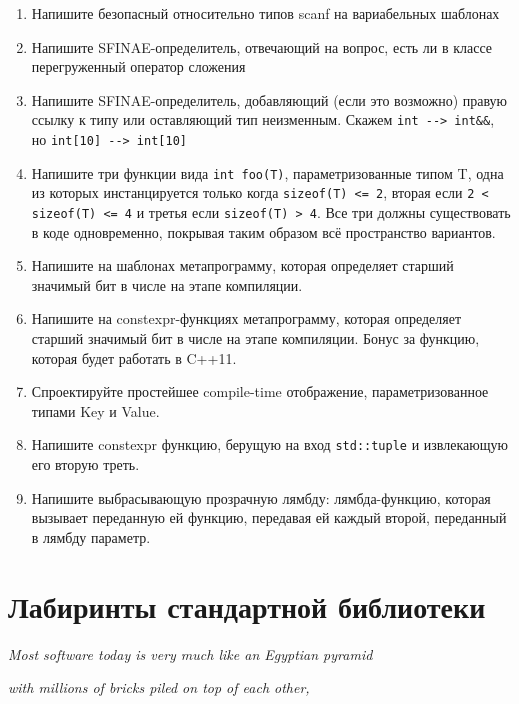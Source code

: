 \documentclass[a4paper,12pt,oneside]{article}
\begin{document}
\begin{enumerate}
\item 
Напишите безопасный относительно типов scanf на вариабельных шаблонах

\item 
Напишите SFINAE-определитель, отвечающий на вопрос, есть ли в классе перегруженный оператор сложения

\item 
Напишите SFINAE-определитель, добавляющий (если это возможно) правую ссылку к типу или оставляющий тип неизменным. Скажем \lstinline!int --> int&&!, но \lstinline!int[10] --> int[10]!

\item 
Напишите три функции вида \lstinline!int foo(T)!, параметризованные типом T, одна из которых инстанцируется только когда \lstinline!sizeof(T) <= 2!, вторая если \lstinline!2 < sizeof(T) <= 4! и третья если \lstinline!sizeof(T) > 4!. Все три должны существовать в коде одновременно, покрывая таким образом всё пространство вариантов.

\item 
Напишите на шаблонах метапрограмму, которая определяет старший значимый бит в числе на этапе компиляции.

\item 
Напишите на constexpr-функциях метапрограмму, которая определяет старший значимый бит в числе на этапе компиляции. Бонус за функцию, которая будет работать в C++11.

\item 
Спроектируйте простейшее compile-time отображение, параметризованное типами Key и Value.

\item 
Напишите constexpr функцию, берущую на вход \lstinline!std::tuple! и извлекающую его вторую треть.

\item 
Напишите выбрасывающую прозрачную лямбду: лямбда-функцию, которая вызывает переданную ей функцию, передавая ей каждый второй, переданный в лямбду параметр.

\end{enumerate}

\pagebreak
\section{Лабиринты стандартной библиотеки}

\hfill\textit{Most software today is very much like an Egyptian pyramid}

\hfill\textit{with millions of bricks piled on top of each other,}
\end{document}
